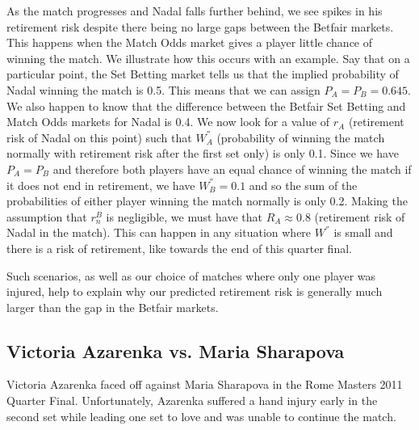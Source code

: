 \documentclass[authoryear, 12pt]{elsarticle}
\begin{document}
As the match progresses and Nadal falls further behind, we see spikes in his retirement risk despite there being no large gaps between the Betfair markets.  This happens when the Match Odds market gives a player little chance of winning the match.  We illustrate how this occurs with an example.  Say that on a particular point, the Set Betting market tells us that the implied probability of Nadal winning the match is 0.5.  This means that we can assign $P_A = P_B = 0.645$.  We also happen to know that the difference between the Betfair Set Betting and Match Odds markets for Nadal is 0.4.  We now look for a value of $r_A$ (retirement risk of Nadal on this point) such that $W_A^{''}$ (probability of winning the match normally with retirement risk after the first set only) is only 0.1.  Since we have $P_A = P_B$ and therefore both players have an equal chance of winning the match if it does not end in retirement, we have $W_B^{''} = 0.1$ and so the sum of the probabilities of either player winning the match normally is only 0.2.  Making the assumption that $r_n^B$ is negligible, we must have that $R_A \approx 0.8$ (retirement risk of Nadal in the match).  This can happen in any situation where $W^{''}$ is small and there is a risk of retirement, like towards the end of this quarter final.

Such scenarios, as well as our choice of matches where only one player was injured, help to explain why our predicted retirement risk is generally much larger than the gap in the Betfair markets.

\subsection{Victoria Azarenka vs. Maria Sharapova}

Victoria Azarenka faced off against Maria Sharapova in the Rome Masters 2011 Quarter Final.  Unfortunately, Azarenka suffered a hand injury early in the second set while leading one set to love and was unable to continue the match.
\end{document}
